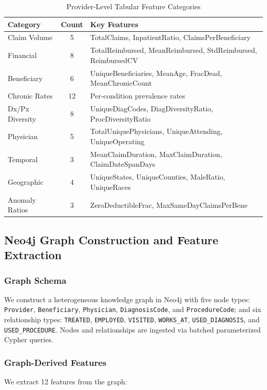 \documentclass[conference]{IEEEtran}
\begin{document}
\begin{table}[t]
\caption{Provider-Level Tabular Feature Categories}
\label{tab:features}
\centering
\small
\begin{tabular}{@{}lcp{4.2cm}@{}}
\toprule
\textbf{Category} & \textbf{Count} & \textbf{Key Features} \\
\midrule
Claim Volume & 5 & TotalClaims, InpatientRatio, ClaimsPerBeneficiary \\
Financial & 8 & TotalReimbursed, MeanReimbursed, StdReimbursed, ReimbursedCV \\
Beneficiary & 6 & UniqueBeneficiaries, MeanAge, FracDead, MeanChronicCount \\
Chronic Rates & 12 & Per-condition prevalence rates \\
Dx/Px Diversity & 8 & UniqueDiagCodes, DiagDiversityRatio, ProcDiversityRatio \\
Physician & 5 & TotalUniquePhysicians, UniqueAttending, UniqueOperating \\
Temporal & 3 & MeanClaimDuration, MaxClaimDuration, ClaimDateSpanDays \\
Geographic & 4 & UniqueStates, UniqueCounties, MaleRatio, UniqueRaces \\
Anomaly Ratios & 3 & ZeroDeductibleFrac, MaxSameDayClaimsPerBene \\
\bottomrule
\end{tabular}
\vspace{-2mm}
\end{table}

\subsection{Neo4j Graph Construction and Feature Extraction}

\subsubsection{Graph Schema}
We construct a heterogeneous knowledge graph in Neo4j with five node types: \texttt{Provider}, \texttt{Beneficiary}, \texttt{Physician}, \texttt{DiagnosisCode}, and \texttt{ProcedureCode}; and six relationship types: \texttt{TREATED}, \texttt{EMPLOYED}, \texttt{VISITED}, \texttt{WORKS\_AT}, \texttt{USED\_DIAGNOSIS}, and \texttt{USED\_PROCEDURE}. Nodes and relationships are ingested via batched parameterized Cypher queries.

\subsubsection{Graph-Derived Features}
We extract 12 features from the graph:
\end{document}
